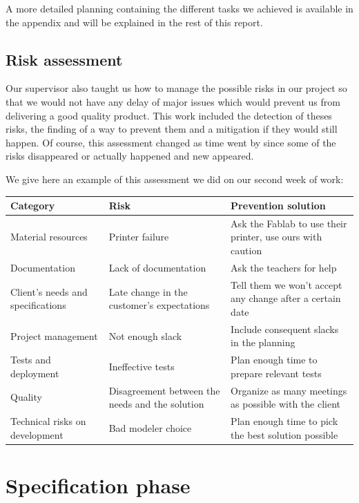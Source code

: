 \documentclass{report}
\begin{document}
A more detailed planning containing the different tasks we achieved is available in the appendix and will be explained in the rest of this report.

\section{Risk assessment}

Our supervisor also taught us how to manage the possible risks in our project so that we would not have any delay of major issues which would prevent us from delivering a good quality product. This work included the detection of theses risks, the finding of a way to prevent them and a mitigation if they would still happen. Of course, this assessment changed as time went by since some of the risks disappeared or actually happened and new appeared.

We give here an example of this assessment we did on our second week of work:

\begin{center}
	\begin{tabular}{|p{4cm}|p{5cm}|p{5cm}|}
		\hline
		Category & Risk & Prevention solution \\ \hline
		Material resources & Printer failure & Ask the Fablab to use their printer, use ours with caution \\
		Documentation & Lack of documentation & Ask the teachers for help \\
		Client's needs and specifications & Late change in the customer's expectations & Tell them we won't accept any change after a certain date \\
		Project management & Not enough slack & Include consequent slacks in the planning \\
		Tests and deployment & Ineffective tests & Plan enough time to prepare relevant tests \\
		Quality & Disagreement between the needs and the solution & Organize as many meetings as possible with the client \\
		Technical risks on development & Bad modeler choice & Plan enough time to pick the best solution possible \\
		\hline
	\end{tabular}
\end{center}

\chapter{Specification phase}
\end{document}
